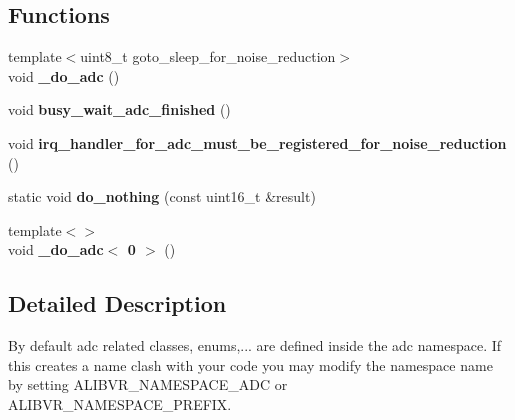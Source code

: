\subsection*{Functions}
\begin{DoxyCompactItemize}
\item 
{\footnotesize template$<$uint8\+\_\+t goto\+\_\+sleep\+\_\+for\+\_\+noise\+\_\+reduction$>$ }\\void {\bfseries \+\_\+do\+\_\+adc} ()\hypertarget{namespaceadc_ab569dff590b3bb745fb012aa29ec5723}{}\label{namespaceadc_ab569dff590b3bb745fb012aa29ec5723}

\item 
void {\bfseries busy\+\_\+wait\+\_\+adc\+\_\+finished} ()\hypertarget{namespaceadc_a4228912d1c32eafc1987a8adb80f4984}{}\label{namespaceadc_a4228912d1c32eafc1987a8adb80f4984}

\item 
void {\bfseries irq\+\_\+handler\+\_\+for\+\_\+adc\+\_\+must\+\_\+be\+\_\+registered\+\_\+for\+\_\+noise\+\_\+reduction} ()\hypertarget{namespaceadc_a0f2e8fa37ba3e91fc9e7a58e3543eaaa}{}\label{namespaceadc_a0f2e8fa37ba3e91fc9e7a58e3543eaaa}

\item 
static void {\bfseries do\+\_\+nothing} (const uint16\+\_\+t \&result)\hypertarget{namespaceadc_a4d20cd58db88b2e3099aa5689e33235d}{}\label{namespaceadc_a4d20cd58db88b2e3099aa5689e33235d}

\item 
{\footnotesize template$<$$>$ }\\void {\bfseries \+\_\+do\+\_\+adc$<$ 0 $>$} ()\hypertarget{namespaceadc_a6e0b185b550424440d92bc2b129f6128}{}\label{namespaceadc_a6e0b185b550424440d92bc2b129f6128}

\end{DoxyCompactItemize}


\subsection{Detailed Description}
By default adc related classes, enums,... are defined inside the {\ttfamily adc} namespace. If this creates a name clash with your code you may modify the namespace name by setting A\+L\+I\+B\+V\+R\+\_\+\+N\+A\+M\+E\+S\+P\+A\+C\+E\+\_\+\+A\+DC or A\+L\+I\+B\+V\+R\+\_\+\+N\+A\+M\+E\+S\+P\+A\+C\+E\+\_\+\+P\+R\+E\+F\+IX. 